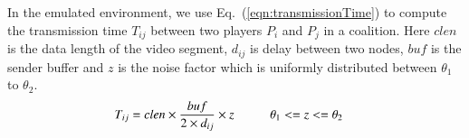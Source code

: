 In the emulated environment, we use Eq.~(\ref{eqn:transmissionTime}) to compute the transmission time $T_{ij}$ between two players $P_i$ and $P_j$ in a coalition. Here $clen$ is the data length of the video segment, $d_{ij}$ is delay between two nodes, $buf$ is the sender buffer and $z$ is the noise factor which is uniformly distributed between $\theta_1$ to $\theta_2$. 
\begin{align}
T_{ij} = clen\times \frac{buf}{2\times d_{ij}} \times z \mbox{\hspace{1cm}}& \theta_1 <= z <= \theta_2  
\label{eqn:transmissionTime}
\end{align}
%
